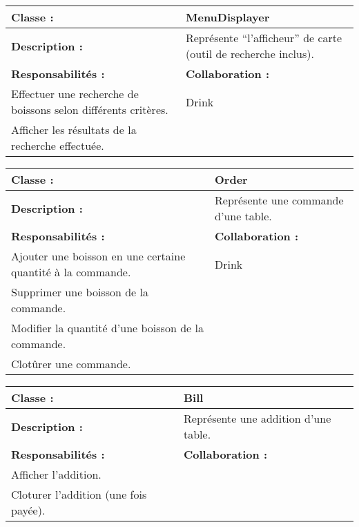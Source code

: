\begin{center}
\vspace{0.5cm}

\begin{tabular}{|p{6cm}p{6cm}|}
	\hline
		\textbf{Classe :} & MenuDisplayer \\
	\hline
		\textbf{Description :} & Représente ``l'afficheur'' de carte (outil de recherche
		inclus). \\
	\hline
		\textbf{Responsabilités :} & \textbf{Collaboration :} \\
		Effectuer une recherche de boissons selon		différents critères. & Drink \\

		Afficher les résultats de la recherche effectuée. & \\
	\hline		
\end{tabular}

\vspace{0.5cm}

\begin{tabular}{|p{6cm}p{6cm}|}
	\hline
		\textbf{Classe :} & Order \\
	\hline
		\textbf{Description :} & Représente une commande d'une table. \\
	\hline
		\textbf{Responsabilités :} & \textbf{Collaboration :} \\

		Ajouter une boisson en une certaine quantité à la commande. & Drink \\
		Supprimer une boisson de la commande. & \\
		Modifier la quantité d'une boisson de la commande. & \\
		Clotûrer une commande. & \\
	\hline		
\end{tabular}

\vspace{0.5cm}

\begin{tabular}{|p{6cm}p{6cm}|}
	\hline
		\textbf{Classe :} & Bill \\
	\hline
		\textbf{Description :} & Représente une addition d'une table. \\
	\hline
		\textbf{Responsabilités :} & \textbf{Collaboration :} \\
		Afficher l'addition. & \\
		Cloturer l'addition (une fois payée). & \\
	\hline		
\end{tabular}

\vspace{0.5cm}


\end{center}
